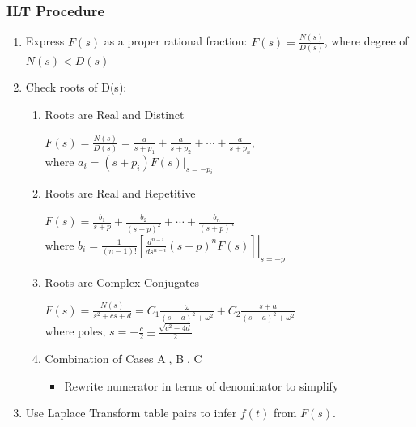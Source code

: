 \documentclass[a4paper]{article}
\begin{document}
\subsubsection{ILT Procedure}
\begin{enumerate}
    \item Express $F(s)$ as a proper rational fraction: $\displaystyle F(s) = \frac{N(s)}{D(s)}$, where degree of $N(s) < D(s)$
    \item Check roots of D(s):
    \begin{enumerate}[label=\large\protect\textcircled{\small\Alph*}]
        \item Roots are Real and Distinct
        \begin{center}
        $\displaystyle F(s) = \frac{N(s)}{D(s)} = \frac{a}{s+p_1}+\frac{a}{s+p_2}+\cdots+\frac{a}{s+p_n},$
        \vspace{0.25cm}\\ 
        $\text{where } a_i = (s+p_i)F(s)|_{s=-p_i}$
        \end{center}
        \item Roots are Real and Repetitive
        \begin{center}
            $\displaystyle F(s) = \frac{b_1}{s+p}+\frac{b_2}{(s+p)^2}+\cdots+\frac{b_n}{(s+p)^n}$
            \vspace{0.25cm}\\ 
            $\text{where }b_i = \displaystyle\frac{1}{(n-1)!}\left[\left.\frac{d^{n-i}}{ds^{n-i}}(s+p)^n F(s)\right]\right|_{s=-p}$
        \end{center}
        \item Roots are Complex Conjugates
        \begin{center}
            $\displaystyle F(s) = \frac{N(s)}{s^2+cs+d} = C_1\frac{\omega}{(s+a)^2+\omega^2}+C_2\frac{s+a}{(s+a)^2+\omega^2}$
            \vspace{0.25cm}\\
            $\displaystyle\text{where poles, }s = -\frac{c}{2}\pm\frac{\sqrt{c^2-4d}}{2} $
        \end{center}
        \item Combination of Cases \large\protect\textcircled{\small A}, \large\protect\textcircled{\small B}, \large\protect\textcircled{\small C}\normalfont
        \begin{itemize}
            \item \normalsize Rewrite numerator in terms of denominator to simplify
        \end{itemize}
    \end{enumerate}
    \item Use Laplace Transform table pairs to infer $f(t)$ from $F(s)$.
\end{enumerate}
\end{document}
